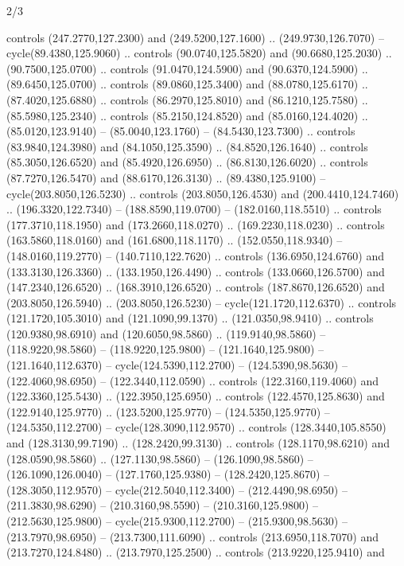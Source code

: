 \begin{flagdescription}{2/3}
\begin{scope}[xshift=0.5\flaglength,yshift=0.5\flagwidth,scale=\stretchfactor]
\begin{scope}[scale=0.001645\flagwidth,yshift=65mm,xshift=-63mm]
\begin{scope}[y=0.80pt, x=0.80pt, yscale=-1,]
\begin{scope}[cm={{1.33333,0.0,0.0,1.33333,(0.0,1e-05)}}]
  controls (247.2770,127.2300) and (249.5200,127.1600) .. (249.9730,126.7070) --
  cycle(89.4380,125.9060) .. controls (90.0740,125.5820) and (90.6680,125.2030)
  .. (90.7500,125.0700) .. controls (91.0470,124.5900) and (90.6370,124.5900) ..
  (89.6450,125.0700) .. controls (89.0860,125.3400) and (88.0780,125.6170) ..
  (87.4020,125.6880) .. controls (86.2970,125.8010) and (86.1210,125.7580) ..
  (85.5980,125.2340) .. controls (85.2150,124.8520) and (85.0160,124.4020) ..
  (85.0120,123.9140) -- (85.0040,123.1760) -- (84.5430,123.7300) .. controls
  (83.9840,124.3980) and (84.1050,125.3590) .. (84.8520,126.1640) .. controls
  (85.3050,126.6520) and (85.4920,126.6950) .. (86.8130,126.6020) .. controls
  (87.7270,126.5470) and (88.6170,126.3130) .. (89.4380,125.9100) --
  cycle(203.8050,126.5230) .. controls (203.8050,126.4530) and
  (200.4410,124.7460) .. (196.3320,122.7340) -- (188.8590,119.0700) --
  (182.0160,118.5510) .. controls (177.3710,118.1950) and (173.2660,118.0270) ..
  (169.2230,118.0230) .. controls (163.5860,118.0160) and (161.6800,118.1170) ..
  (152.0550,118.9340) -- (148.0160,119.2770) -- (140.7110,122.7620) .. controls
  (136.6950,124.6760) and (133.3130,126.3360) .. (133.1950,126.4490) .. controls
  (133.0660,126.5700) and (147.2340,126.6520) .. (168.3910,126.6520) .. controls
  (187.8670,126.6520) and (203.8050,126.5940) .. (203.8050,126.5230) --
  cycle(121.1720,112.6370) .. controls (121.1720,105.3010) and
  (121.1090,99.1370) .. (121.0350,98.9410) .. controls (120.9380,98.6910) and
  (120.6050,98.5860) .. (119.9140,98.5860) -- (118.9220,98.5860) --
  (118.9220,125.9800) -- (121.1640,125.9800) -- (121.1640,112.6370) --
  cycle(124.5390,112.2700) -- (124.5390,98.5630) -- (122.4060,98.6950) --
  (122.3440,112.0590) .. controls (122.3160,119.4060) and (122.3360,125.5430) ..
  (122.3950,125.6950) .. controls (122.4570,125.8630) and (122.9140,125.9770) ..
  (123.5200,125.9770) -- (124.5350,125.9770) -- (124.5350,112.2700) --
  cycle(128.3090,112.9570) .. controls (128.3440,105.8550) and
  (128.3130,99.7190) .. (128.2420,99.3130) .. controls (128.1170,98.6210) and
  (128.0590,98.5860) .. (127.1130,98.5860) -- (126.1090,98.5860) --
  (126.1090,126.0040) -- (127.1760,125.9380) -- (128.2420,125.8670) --
  (128.3050,112.9570) -- cycle(212.5040,112.3400) -- (212.4490,98.6950) --
  (211.3830,98.6290) -- (210.3160,98.5590) -- (210.3160,125.9800) --
  (212.5630,125.9800) -- cycle(215.9300,112.2700) -- (215.9300,98.5630) --
  (213.7970,98.6950) -- (213.7300,111.6090) .. controls (213.6950,118.7070) and
  (213.7270,124.8480) .. (213.7970,125.2500) .. controls (213.9220,125.9410) and

\end{scope}
\end{scope}
\end{scope}
\end{scope}
\end{flagdescription}

